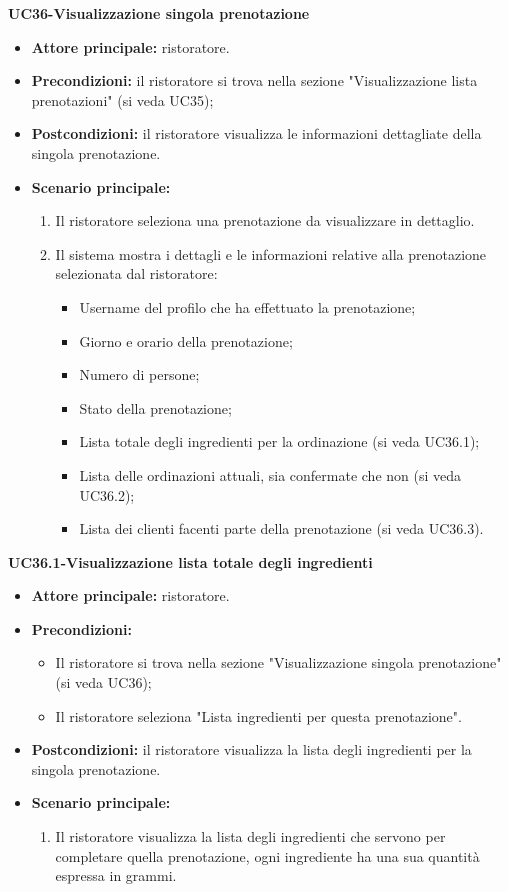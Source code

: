 \textbf{UC36-Visualizzazione singola prenotazione}
\begin{itemize}
    \item \textbf{Attore principale:} ristoratore.
    \item \textbf{Precondizioni:} il ristoratore si trova nella sezione "Visualizzazione lista prenotazioni" (si veda UC35);
    \item \textbf{Postcondizioni:} il ristoratore visualizza le informazioni dettagliate della singola prenotazione.
    \item \textbf{Scenario principale:}
    \begin{enumerate}
        \item Il ristoratore seleziona una prenotazione da visualizzare in dettaglio.
        \item Il sistema mostra i dettagli e le informazioni relative alla prenotazione selezionata dal ristoratore:
        \begin{itemize}
            \item Username del profilo che ha effettuato la prenotazione;
            \item Giorno e orario della prenotazione;
            \item Numero di persone;
            \item Stato della prenotazione;
            \item Lista totale degli ingredienti per la ordinazione (si veda UC36.1);
            \item Lista delle ordinazioni attuali, sia confermate che non (si veda UC36.2);
            \item Lista dei clienti facenti parte della prenotazione (si veda UC36.3).
        \end{itemize}
    \end{enumerate}
\end{itemize}

\textbf{UC36.1-Visualizzazione lista totale degli ingredienti}
\begin{itemize}
    \item \textbf{Attore principale:} ristoratore.
    \item \textbf{Precondizioni:} 
    \begin{itemize}
        \item Il ristoratore si trova nella sezione "Visualizzazione singola prenotazione" (si veda UC36);
        \item Il ristoratore seleziona "Lista ingredienti per questa prenotazione".
    \end{itemize}
    \item \textbf{Postcondizioni:} il ristoratore visualizza la lista degli ingredienti per la singola prenotazione.
    \item \textbf{Scenario principale:}
    \begin{enumerate}
        \item Il ristoratore visualizza la lista degli ingredienti che servono per completare quella prenotazione, ogni ingrediente ha una sua quantità espressa in grammi.
    \end{enumerate}
\end{itemize}

